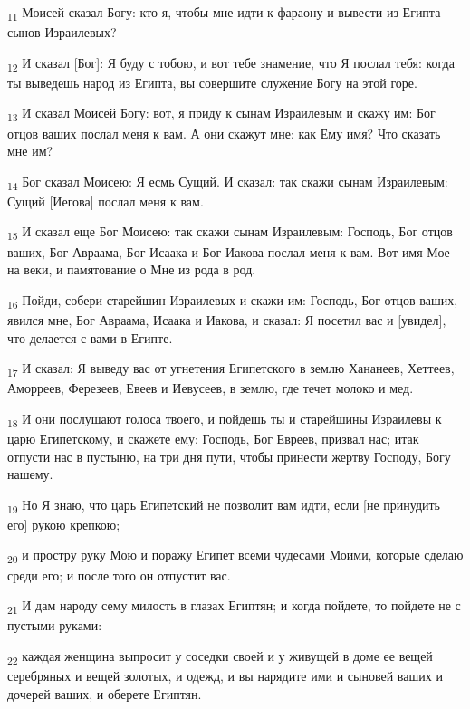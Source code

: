 \begin{tcolorbox}
\textsubscript{11} Моисей сказал Богу: кто я, чтобы мне идти к фараону и вывести из Египта сынов Израилевых?
\end{tcolorbox}
\begin{tcolorbox}
\textsubscript{12} И сказал [Бог]: Я буду с тобою, и вот тебе знамение, что Я послал тебя: когда ты выведешь народ из Египта, вы совершите служение Богу на этой горе.
\end{tcolorbox}
\begin{tcolorbox}
\textsubscript{13} И сказал Моисей Богу: вот, я приду к сынам Израилевым и скажу им: Бог отцов ваших послал меня к вам. А они скажут мне: как Ему имя? Что сказать мне им?
\end{tcolorbox}
\begin{tcolorbox}
\textsubscript{14} Бог сказал Моисею: Я есмь Сущий. И сказал: так скажи сынам Израилевым: Сущий [Иегова] послал меня к вам.
\end{tcolorbox}
\begin{tcolorbox}
\textsubscript{15} И сказал еще Бог Моисею: так скажи сынам Израилевым: Господь, Бог отцов ваших, Бог Авраама, Бог Исаака и Бог Иакова послал меня к вам. Вот имя Мое на веки, и памятование о Мне из рода в род.
\end{tcolorbox}
\begin{tcolorbox}
\textsubscript{16} Пойди, собери старейшин Израилевых и скажи им: Господь, Бог отцов ваших, явился мне, Бог Авраама, Исаака и Иакова, и сказал: Я посетил вас и [увидел], что делается с вами в Египте.
\end{tcolorbox}
\begin{tcolorbox}
\textsubscript{17} И сказал: Я выведу вас от угнетения Египетского в землю Хананеев, Хеттеев, Аморреев, Ферезеев, Евеев и Иевусеев, в землю, где течет молоко и мед.
\end{tcolorbox}
\begin{tcolorbox}
\textsubscript{18} И они послушают голоса твоего, и пойдешь ты и старейшины Израилевы к царю Египетскому, и скажете ему: Господь, Бог Евреев, призвал нас; итак отпусти нас в пустыню, на три дня пути, чтобы принести жертву Господу, Богу нашему.
\end{tcolorbox}
\begin{tcolorbox}
\textsubscript{19} Но Я знаю, что царь Египетский не позволит вам идти, если [не принудить его] рукою крепкою;
\end{tcolorbox}
\begin{tcolorbox}
\textsubscript{20} и простру руку Мою и поражу Египет всеми чудесами Моими, которые сделаю среди его; и после того он отпустит вас.
\end{tcolorbox}
\begin{tcolorbox}
\textsubscript{21} И дам народу сему милость в глазах Египтян; и когда пойдете, то пойдете не с пустыми руками:
\end{tcolorbox}
\begin{tcolorbox}
\textsubscript{22} каждая женщина выпросит у соседки своей и у живущей в доме ее вещей серебряных и вещей золотых, и одежд, и вы нарядите ими и сыновей ваших и дочерей ваших, и оберете Египтян.
\end{tcolorbox}
